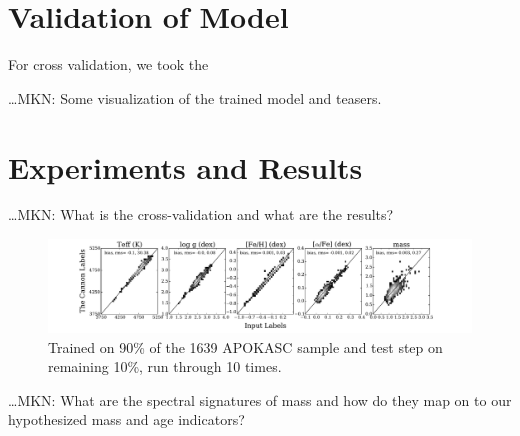 \documentclass[12pt, preprint]{aastex}
\begin{document}
\section{Validation of Model}

For cross validation, we took the 




\ldots MKN: Some visualization of the trained model and teasers.

\section{Experiments and Results}

\ldots MKN: What is the cross-validation and what are the results?
\begin{figure}[h!]
\centering
    \includegraphics[scale=0.31]{./plots/validation_1500.pdf}
  \caption{Trained on 90\% of the 1639 APOKASC sample and test step on remaining 10\%, run through 10 times.}
\label{fig:validation}
\end{figure}

\ldots MKN: What are the spectral signatures of mass and how do they
map on to our hypothesized mass and age indicators?
\end{document}
